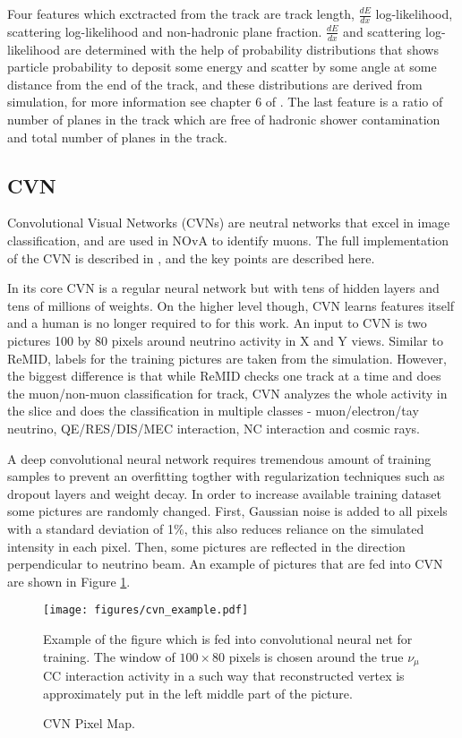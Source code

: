 Four features which exctracted from the track are track length, $\frac{dE}{dx}$ log-likelihood, scattering 
log-likelihood and non-hadronic plane fraction. $\frac{dE}{dx}$ and scattering log-likelihood are determined with 
the help of probability distributions that shows particle probability to deposit some energy and scatter by some 
angle at some distance from the end of the track, and these distributions are derived from simulation, for more 
information see chapter 6 of \cite{Nick}. The last feature is a ratio of number of planes in the track which are 
free of hadronic shower contamination and total number of planes in the track. 

\subsection{CVN}
Convolutional Visual Networks (CVNs) are neutral networks that excel in image classification, and are used in
NOvA to identify muons. The full implementation of the CVN is described in \cite{CVN}, and the key points are
described here.

In its core CVN is a regular neural network but with tens of hidden layers and tens of millions of weights. 
On the higher level though, CVN learns features itself and a human is no longer required to for this work.
An input to CVN is two pictures 100 by 80 pixels around neutrino activity in X and Y views. Similar to ReMID, labels 
for the training pictures are taken from the simulation. However, the biggest difference is that while ReMID checks
one track at a time and does the muon/non-muon classification for track, CVN analyzes the whole activity in the 
slice and does the classification in multiple classes - muon/electron/tay neutrino, QE/RES/DIS/MEC interaction, 
NC interaction and cosmic rays.

A deep convolutional neural network requires tremendous amount of training samples to prevent an overfitting togther 
with regularization techniques such as dropout layers and weight decay. In order to increase available 
training dataset some pictures are randomly changed. First, Gaussian noise is added to all pixels with a standard 
deviation of 1$\%$, this also reduces reliance on the simulated intensity in each pixel. Then, some pictures 
are reflected in the direction perpendicular to neutrino beam. An example of pictures that are fed into CVN are
shown in Figure \ref{fig:cvn_example}.
\begin{figure}[h]
\texttt{[image: figures/cvn\_example.pdf]}
\centering
\caption{CVN Pixel Map.}
{Example of the figure which is fed into convolutional neural net for training. The window of $100\times80$ 
pixels is chosen around the true $\nu_\mu$ CC interaction activity in a such way that reconstructed vertex is 
approximately put in the left middle part of the picture.}
\label{fig:cvn_example}
\end{figure}

